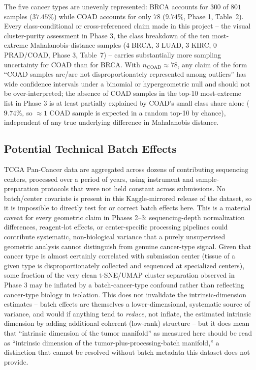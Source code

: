 \documentclass[11pt]{article}
\begin{document}
The five cancer types are unevenly represented: BRCA accounts for
$300$ of $801$ samples ($37.45\%$) while COAD accounts for only $78$
($9.74\%$, Phase 1, Table~2). Every class-conditional or cross-referenced
claim made in this project -- the visual cluster-purity assessment in
Phase 3, the class breakdown of the ten most-extreme Mahalanobis-distance
samples (4 BRCA, 3 LUAD, 3 KIRC, $0$ PRAD/COAD, Phase 3, Table~7) -- carries
substantially more sampling uncertainty for COAD than for BRCA. With
$n_{\text{COAD}} \approx 78$, any claim of the form ``COAD samples are/are
not disproportionately represented among outliers'' has wide confidence
intervals under a binomial or hypergeometric null and should not be
over-interpreted; the absence of COAD samples in the top-10 most-extreme
list in Phase 3 is at least partially explained by COAD's small class
share alone ($9.74\%$, so $\approx 1$ COAD sample is expected in a random
top-10 by chance), independent of any true underlying difference in
Mahalanobis distance.

\subsection{Potential Technical Batch Effects}

TCGA Pan-Cancer data are aggregated across dozens of contributing sequencing
centers, processed over a period of years, using instrument and
sample-preparation protocols that were not held constant across
submissions. No batch/center covariate is present in this Kaggle-mirrored
release of the dataset, so it is impossible to directly test for or correct
batch effects here. This is a material caveat for every geometric claim in
Phases 2--3: sequencing-depth normalization differences, reagent-lot
effects, or center-specific processing pipelines could contribute
systematic, non-biological variance that a purely unsupervised geometric
analysis cannot distinguish from genuine cancer-type signal. Given that
cancer type is almost certainly correlated with submission center (tissue
of a given type is disproportionately collected and sequenced at
specialized centers), some fraction of the very clean t-SNE/UMAP cluster
separation observed in Phase 3 may be inflated by a batch-cancer-type
confound rather than reflecting cancer-type biology in isolation. This does
not invalidate the intrinsic-dimension estimates -- batch effects are
themselves a lower-dimensional, systematic source of variance, and would if
anything tend to \emph{reduce}, not inflate, the estimated intrinsic
dimension by adding additional coherent (low-rank) structure -- but it does
mean that ``intrinsic dimension of the tumor manifold'' as measured here
should be read as ``intrinsic dimension of the tumor-plus-processing-batch
manifold,'' a distinction that cannot be resolved without batch metadata
this dataset does not provide.
\end{document}
